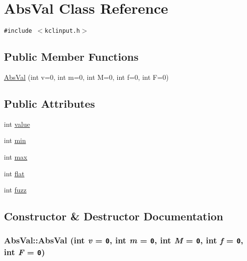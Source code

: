 \hypertarget{class_abs_val}{
\section{AbsVal Class Reference}
\label{class_abs_val}
}
{\tt \#include $<$kclinput.h$>$}

\subsection*{Public Member Functions}
\begin{CompactItemize}
\item 
\hyperlink{class_abs_val_1da0dbbce6fd776f580af9a149dfa21f}{AbsVal} (int v=0, int m=0, int M=0, int f=0, int F=0)
\end{CompactItemize}
\subsection*{Public Attributes}
\begin{CompactItemize}
\item 
int \hyperlink{class_abs_val_dea4f7aaaa630dc1e6784f3ce53294d6}{value}
\item 
int \hyperlink{class_abs_val_54069174e3b0dce6d75441750c2cb847}{min}
\item 
int \hyperlink{class_abs_val_e3764282970217b3f29827fe57da2a92}{max}
\item 
int \hyperlink{class_abs_val_87b40db59ddae36a643ca1a071b52116}{flat}
\item 
int \hyperlink{class_abs_val_872d15b6f387725daaaeb2e947a8ddde}{fuzz}
\end{CompactItemize}


\subsection{Constructor \& Destructor Documentation}
\hypertarget{class_abs_val_1da0dbbce6fd776f580af9a149dfa21f}{
\subsubsection[{AbsVal}]{\setlength{\rightskip}{0pt plus 5cm}AbsVal::AbsVal (int {\em v} = {\tt 0}, \/  int {\em m} = {\tt 0}, \/  int {\em M} = {\tt 0}, \/  int {\em f} = {\tt 0}, \/  int {\em F} = {\tt 0})}}
\label{class_abs_val_1da0dbbce6fd776f580af9a149dfa21f}





